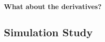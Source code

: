 \documentclass{beamer} %
\begin{document}
\begin{frame}
\textbf{What about the derivatives?}

\begin{figure}[p]
    \centering

    \label{fig:sim1-1replic}
\end{figure}
\end{frame}





\subsection{Simulation Study}
\end{document}
